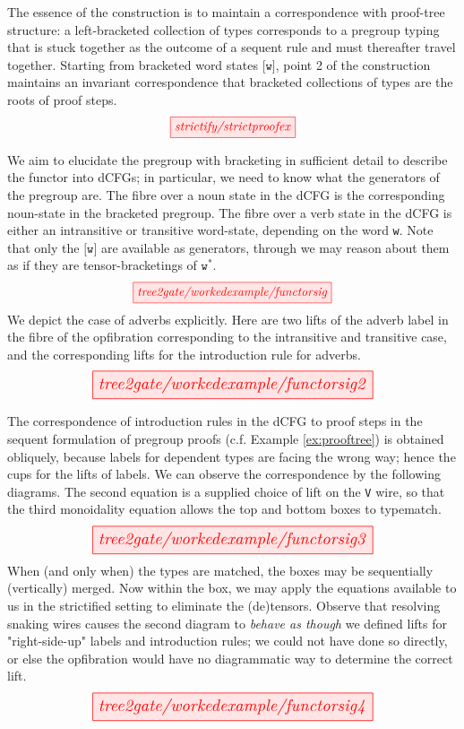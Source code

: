 \begin{example}\label{ex:prooftree}
The essence of the construction is to maintain a correspondence with proof-tree structure: a left-bracketed collection of types corresponds to a pregroup typing that is stuck together as the outcome of a sequent rule and must thereafter travel together. Starting from bracketed word states $\texttt{[w]}$, point 2 of the construction maintains an invariant correspondence that bracketed collections of types are the roots of proof steps.
\[\tikzfig{strictify/strictproofex}\]
\end{example}

\begin{myboxR}
\begin{construction}\label{cons:pg2cfg} We aim to elucidate the pregroup with bracketing in sufficient detail to describe the functor into dCFGs; in particular, we need to know what the generators of the pregroup are. The fibre over a noun state in the dCFG is the corresponding noun-state in the bracketed pregroup. The fibre over a verb state in the dCFG is either an intransitive or transitive word-state, depending on the word \texttt{w}. Note that only the $\texttt{[w]}$ are available as generators, through we may reason about them as if they are tensor-bracketings of $\texttt{w}^*$.
\[\resizebox{0.5\textwidth}{!}{\tikzfig{tree2gate/workedexample/functorsig}}\]
We depict the case of adverbs explicitly. Here are two lifts of the adverb label in the fibre of the opfibration corresponding to the intransitive and transitive case, and the corresponding lifts for the introduction rule for adverbs.
\[\resizebox{0.7\textwidth}{!}{\tikzfig{tree2gate/workedexample/functorsig2}}\]
\end{construction}
\end{myboxR}

\begin{myboxR}
The correspondence of introduction rules in the dCFG to proof steps in the sequent formulation of pregroup proofs (c.f. Example \ref{ex:prooftree}) is obtained obliquely, because labels for dependent types are facing the wrong way; hence the cups for the lifts of labels. We can observe the correspondence by the following diagrams. The second equation is a supplied choice of lift on the \texttt{V} wire, so that the third monoidality equation allows the top and bottom boxes to typematch.
\[\resizebox{0.7\textwidth}{!}{\tikzfig{tree2gate/workedexample/functorsig3}}\]
When (and only when) the types are matched, the boxes may be sequentially (vertically) merged. Now within the box, we may apply the equations available to us in the strictified setting to eliminate the (de)tensors. Observe that resolving snaking wires causes the second diagram to \emph{behave as though} we defined lifts for "right-side-up" labels and introduction rules; we could not have done so directly, or else the opfibration would have no diagrammatic way to determine the correct lift.
\[\resizebox{0.7\textwidth}{!}{\tikzfig{tree2gate/workedexample/functorsig4}}\]
\end{myboxR}


